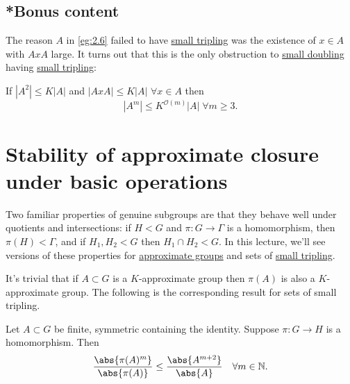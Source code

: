 \documentclass{article}
\newcommand{\ratio}[2]{\frac{\abs{#1}}{\abs{#2}}}
\numberwithin{equation}{section}
\begin{document}
\color{gray}
\subsection*{*Bonus content}
The reason $A$ in \cref{eg:2.6} failed to have \hyperlink{def:tripling}{small tripling} was the existence of $x \in A$ with $A x A$ large.
It turns out that this is the only obstruction to \hyperlink{def:doubling}{small doubling} having \hyperlink{def:tripling}{small tripling}:
\begin{thm}\label{thm:3.5}
  If $|A^2| \leq K|A|$ and $|AxA| \leq K|A|$ $\forall x \in A$ then
  \begin{equation*}|A^m| \leq K^{\mathcal{O}(m)} |A| \; \forall m \geq 3.\end{equation*}
\end{thm}
\color{black}

\clearpage
\section{Stability of approximate closure under basic operations}
\newlec
Two familiar properties of genuine subgroups are that they behave well under quotients and intersections:
if $H < G$ and $\pi: G \to \Gamma$ is a homomorphism, then $\pi(H) < \Gamma$, and if $H_1, H_2 < G$ then $H_1 \cap H_2 < G$.
In this lecture, we'll see versions of these properties for \hyperlink{def:appGroup}{approximate groups} and sets of \hyperlink{def:tripling}{small tripling}.

It's trivial that if $A \subset G$ is a $K$-approximate group then $\pi(A)$ is also a $K$-approximate group.
The following is the corresponding result for sets of small tripling.
\begin{nlemma}\label{lem:4.1}
  Let $A \subset G$ be finite, symmetric containing the identity. Suppose $\pi: G \to H$ is a homomorphism. Then
  \begin{equation*}
    \ratio{\pi(A)^m}{\pi(A)} \leq \ratio{A^{m+2}}{A} \quad \forall m \in \mathbb{N}.
  \end{equation*}
\end{nlemma}
\end{document}
